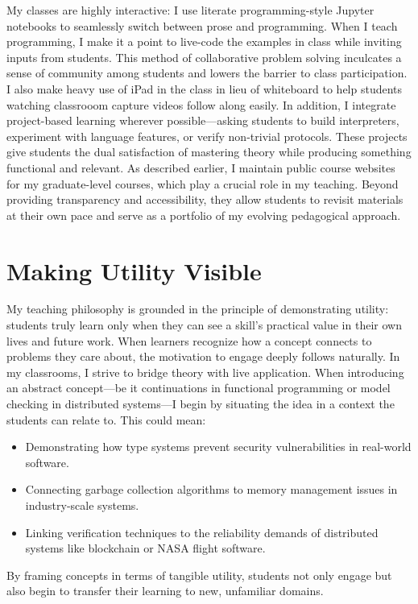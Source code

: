 My classes are highly interactive: I use literate programming-style Jupyter
notebooks to seamlessly switch between prose and programming. When I teach
programming, I make it a point to live-code the examples in class while
inviting inputs from students. This method of collaborative problem solving
inculcates a sense of community among students and lowers the barrier to
class participation. I also make heavy use of iPad in the class in lieu of
whiteboard to help students watching classrooom capture videos follow along
easily. In addition, I integrate project-based learning wherever
possible—asking students to build interpreters, experiment with language
features, or verify non-trivial protocols. These projects give students the
dual satisfaction of mastering theory while producing something functional
and relevant. As described earlier, I maintain public course websites for
my graduate-level courses, which play a crucial role in my teaching. Beyond
providing transparency and accessibility, they allow students to revisit
materials at their own pace and serve as a portfolio of my evolving
pedagogical approach.

\section*{Making Utility Visible}

My teaching philosophy is grounded in the principle of demonstrating
utility: students truly learn only when they can see a skill's practical
value in their own lives and future work. When learners recognize how a
concept connects to problems they care about, the motivation to engage
deeply follows naturally. In my classrooms, I strive to bridge theory with
live application. When introducing an abstract concept—be it continuations
in functional programming or model checking in distributed systems—I begin
by situating the idea in a context the students can relate to. This could
mean:
\begin{itemize}
    \item Demonstrating how type systems prevent security vulnerabilities in real-world software.
    \item Connecting garbage collection algorithms to memory management issues in industry-scale systems.
    \item Linking verification techniques to the reliability demands of distributed systems like blockchain or NASA flight software.
\end{itemize}
By framing concepts in terms of tangible utility, students not only engage but also begin to transfer their learning to new, unfamiliar domains.

